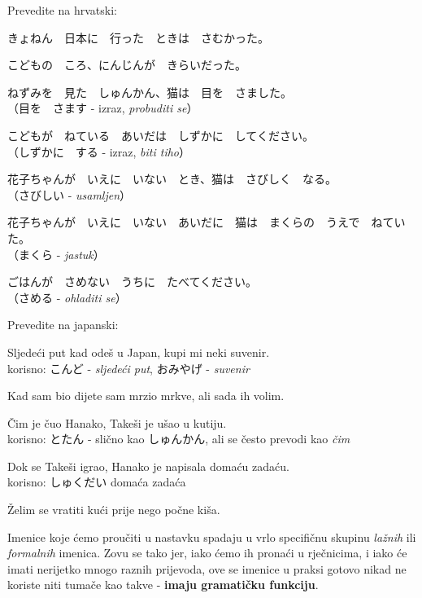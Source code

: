 	
	\begin{mondai}{Prevedite na hrvatski:}
		\item きょねん　日本に　行った　ときは　さむかった。
		\item こどもの　ころ、にんじんが　きらいだった。
		\item ねずみを　見た　しゅんかん、猫は　目を　さました。\\（目を　さます - izraz, \textit{probuditi se}）
		\item こどもが　ねている　あいだは　しずかに　してください。\\（しずかに　する - izraz, \textit{biti tiho}）
		\item 花子ちゃんが　いえに　いない　とき、猫は　さびしく　なる。\\（さびしい - \textit{usamljen}）
		\item 花子ちゃんが　いえに　いない　あいだに　猫は　まくらの　うえで　ねていた。\\（まくら - \textit{jastuk}）
		\item ごはんが　さめない　うちに　たべてください。\\（さめる - \textit{ohladiti se}）
	\end{mondai}

	\begin{mondai}{Prevedite na japanski:}
		\item Sljedeći put kad odeš u Japan, kupi mi neki suvenir.\\korisno: こんど - \textit{sljedeći put}, おみやげ - \textit{suvenir}
		\item Kad sam bio dijete sam mrzio mrkve, ali sada ih volim.
		\item Čim je čuo Hanako, Takeši je ušao u kutiju.\\korisno: とたん - slično kao しゅんかん, ali se često prevodi kao \textit{čim}
		\item Dok se Takeši igrao, Hanako je napisala domaću zadaću.\\korisno: しゅくだい domaća zadaća
		\item Želim se vratiti kući prije nego počne kiša.
	\end{mondai}

\newpage
{}

	
	
	Imenice koje ćemo proučiti u nastavku spadaju u vrlo specifičnu skupinu \textit{lažnih} ili \textit{formalnih} imenica\footnotemark[1]. Zovu se tako jer, iako ćemo ih pronaći u rječnicima, i iako će imati nerijetko mnogo raznih prijevoda, ove se imenice u praksi gotovo nikad ne koriste niti tumače kao takve - \textbf{imaju gramatičku funkciju}.
	
